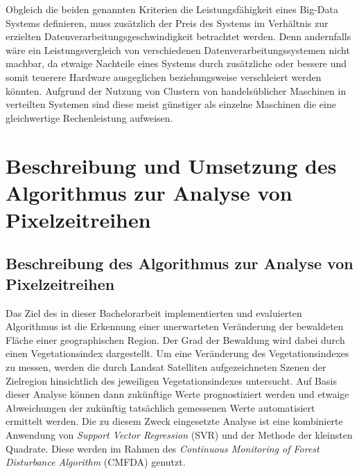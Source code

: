 Obgleich die beiden genannten Kriterien die Leistungsfähigkeit eines Big-Data Systems definieren, muss zusätzlich der Preis des Systems im Verhältnis zur erzielten Datenverarbeitungsgeschwindigkeit betrachtet werden. Denn andernfalls wäre ein Leistungsvergleich von verschiedenen Datenverarbeitungssystemen nicht machbar, da etwaige Nachteile eines Systems durch zusätzliche oder bessere und somit teuerere Hardware ausgeglichen beziehungsweise verschleiert werden könnten. Aufgrund der Nutzung von Clustern von handelsüblicher Maschinen in verteilten Systemen sind diese meist günstiger als einzelne Maschinen die eine gleichwertige Rechenleistung aufweisen.


\chapter[Algorithmus zur Analyse von Pixelzeitreihen]{Beschreibung und Umsetzung des Algorithmus zur Analyse von Pixelzeitreihen}
\label{cha:AlgorithmForSatellitePictureAnalysis}
\section[Beschreibung des Algorithmus]{Beschreibung des Algorithmus zur Analyse von Pixelzeitreihen}
\label{sec:DescriptionOfTheAlgorithm}
Das Ziel des in dieser Bachelorarbeit implementierten und evaluierten Algorithmus ist die Erkennung einer unerwarteten Veränderung der bewaldeten Fläche einer geographischen Region. Der Grad der Bewaldung wird dabei durch einen Vegetationsindex dargestellt. Um eine Veränderung des Vegetationsindexes zu messen, werden die durch Landsat Satelliten aufgezeichneten Szenen der Zielregion hinsichtlich des jeweiligen Vegetationsindexes untersucht. Auf Basis dieser Analyse können dann zukünftige Werte prognostiziert werden und etwaige Abweichungen der zukünftig tatsächlich gemessenen Werte automatisiert ermittelt werden. Die zu diesem Zweck eingesetzte Analyse ist eine kombinierte Anwendung von \textit{Support Vector Regression} (SVR) \cite{Basak2007} und der Methode der kleinsten Quadrate. Diese werden im Rahmen des \textit{Continuous Monitoring of Forest Disturbance Algorithm} (CMFDA) \cite{Zhu2012} genutzt. %

